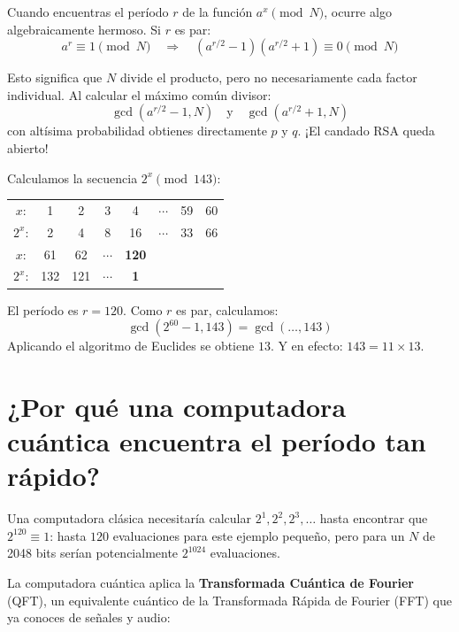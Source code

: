 Cuando encuentras el período $r$ de la función $a^x \pmod N$, ocurre algo algebraicamente hermoso. Si $r$ es par:
\[
a^r \equiv 1 \pmod N \quad \Rightarrow \quad (a^{r/2} - 1)(a^{r/2} + 1) \equiv 0 \pmod N
\]

Esto significa que $N$ divide el producto, pero no necesariamente cada factor individual. Al calcular el máximo común divisor:
\[
\gcd(a^{r/2} - 1, N) \quad \text{y} \quad \gcd(a^{r/2} + 1, N)
\]
con altísima probabilidad obtienes directamente $p$ y $q$. ¡El candado RSA queda abierto!

\begin{ejemplonumerico}[Shor con $N = 143$, $a = 2$]
Calculamos la secuencia $2^x \pmod{143}$:
\begin{center}
\begin{tabular}{cccccccc}
$x$: & 1 & 2 & 3 & 4 & $\cdots$ & 59 & 60 \\
$2^x$: & 2 & 4 & 8 & 16 & $\cdots$ & 33 & 66 \\
$x$: & 61 & 62 & $\cdots$ & \textbf{120} & & & \\
$2^x$: & 132 & 121 & $\cdots$ & \textbf{1} & & & \\
\end{tabular}
\end{center}
El período es $r = 120$. Como $r$ es par, calculamos:
\[
\gcd(2^{60} - 1, 143) = \gcd(\ldots, 143)
\]
Aplicando el algoritmo de Euclides se obtiene $13$. Y en efecto: $143 = 11 \times 13$.
\end{ejemplonumerico}

\section{¿Por qué una computadora cuántica encuentra el período tan rápido?}

Una computadora clásica necesitaría calcular $2^1, 2^2, 2^3, \dots$ hasta encontrar que $2^{120} \equiv 1$: hasta $120$ evaluaciones para este ejemplo pequeño, pero para un $N$ de 2048 bits serían potencialmente $2^{1024}$ evaluaciones.

La computadora cuántica aplica la \textbf{Transformada Cuántica de Fourier} (QFT), un equivalente cuántico de la Transformada Rápida de Fourier (FFT) que ya conoces de señales y audio:


